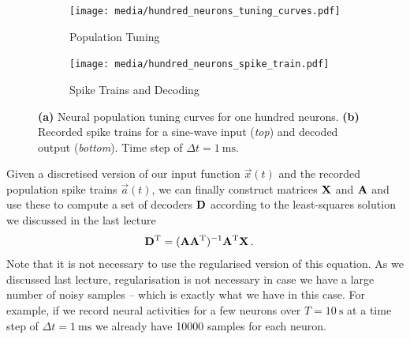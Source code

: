 \documentclass[10pt,letterpaper,oneside]{article}
\begin{document}
\begin{figure}[p]
	\begin{subfigure}[b]{0.4\textwidth}
		\centering
		\texttt{[image: media/hundred\_neurons\_tuning\_curves.pdf]}
		\caption{Population Tuning}
	\end{subfigure}
	\begin{subfigure}[b]{0.6\textwidth}
		\centering
		\texttt{[image: media/hundred\_neurons\_spike\_train.pdf]}
		\caption{Spike Trains and Decoding}
	\end{subfigure}
	\caption{\textbf{(a)} Neural population tuning curves for one hundred neurons. \textbf{(b)} Recorded spike trains for a sine-wave input (\emph{top}) and decoded output (\emph{bottom}).  Time step of $\Delta t = \SI{1}{\milli\second}$. }
	\label{fig:hundred_neurons}
\end{figure}

Given a discretised version of our input function $\vec x(t)$ and the recorded population spike trains $\vec a(t)$, we can finally construct matrices ${\mathbf{X}}$ and ${\mathbf{A}}$ and use these to compute a set of decoders ${\mathbf{D}}$ according to the least-squares solution we discussed in the last lecture
\begin{align*}
	{\mathbf{D}}^{\mathrm{T}} &= ({\mathbf{A}} {\mathbf{A}}^{\mathrm{T}})^{-1} {\mathbf{A}}^{\mathrm{T}} {\mathbf{X}} \,.
\end{align*}
Note that it is not necessary to use the regularised version of this equation. As we discussed last lecture, regularisation is not necessary in case we have a large number of noisy samples -- which is exactly what we have in this case. For example, if we record neural activities for a few neurons over $T = \SI{10}{\second}$ at a time step of $\Delta t = \SI{1}{\milli\second}$ we already have \num{10000} samples for each neuron.

\end{document}
